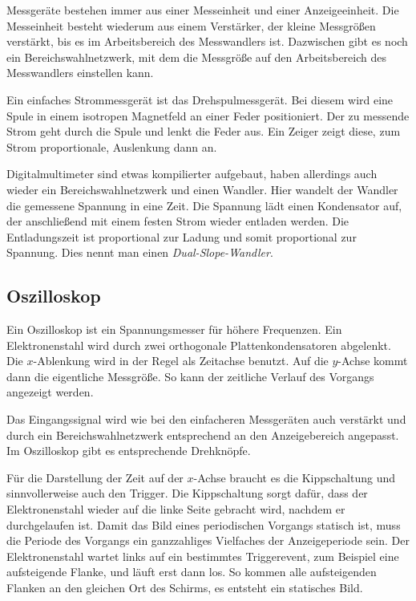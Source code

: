 Messgeräte bestehen immer aus einer Messeinheit und einer Anzeigeeinheit. Die
Messeinheit besteht wiederum aus einem Verstärker, der kleine Messgrößen
verstärkt, bis es im Arbeitsbereich des Messwandlers ist. Dazwischen gibt es
noch ein Bereichswahlnetzwerk, mit dem die Messgröße auf den Arbeitsbereich des
Messwandlers einstellen kann.

Ein einfaches Strommessgerät ist das Drehspulmessgerät. Bei diesem wird eine
Spule in einem isotropen Magnetfeld an einer Feder positioniert. Der zu
messende Strom geht durch die Spule und lenkt die Feder aus. Ein Zeiger zeigt
diese, zum Strom proportionale, Auslenkung dann an.

Digitalmultimeter sind etwas kompilierter aufgebaut, haben allerdings auch
wieder ein Bereichswahlnetzwerk und einen Wandler. Hier wandelt der Wandler die
gemessene Spannung in eine Zeit. Die Spannung lädt einen Kondensator auf, der
anschließend mit einem festen Strom wieder entladen werden. Die Entladungszeit
ist proportional zur Ladung und somit proportional zur Spannung. Dies nennt man
einen \emph{Dual-Slope-Wandler}.

\subsection{Oszilloskop}

Ein Oszilloskop ist ein Spannungsmesser für höhere Frequenzen. Ein
Elektronenstahl wird durch zwei orthogonale Plattenkondensatoren abgelenkt. Die
$x$-Ablenkung wird in der Regel als Zeitachse benutzt. Auf die $y$-Achse kommt
dann die eigentliche Messgröße. So kann der zeitliche Verlauf des Vorgangs
angezeigt werden.

Das Eingangssignal wird wie bei den einfacheren Messgeräten auch verstärkt und durch ein Bereichswahlnetzwerk entsprechend an den Anzeigebereich angepasst. Im Oszilloskop gibt es entsprechende Drehknöpfe.

Für die Darstellung der Zeit auf der $x$-Achse braucht es die Kippschaltung und
sinnvollerweise auch den Trigger. Die Kippschaltung sorgt dafür, dass der
Elektronenstahl wieder auf die linke Seite gebracht wird, nachdem er
durchgelaufen ist. Damit das Bild eines periodischen Vorgangs statisch ist,
muss die Periode des Vorgangs ein ganzzahliges Vielfaches der Anzeigeperiode
sein. Der Elektronenstahl wartet links auf ein bestimmtes Triggerevent, zum
Beispiel eine aufsteigende Flanke, und läuft erst dann los. So kommen alle
aufsteigenden Flanken an den gleichen Ort des Schirms, es entsteht ein
statisches Bild.

